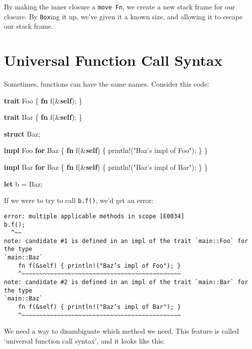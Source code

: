 \documentclass[a4paper,]{book}
\newenvironment{Shaded}{\begin{snugshade}}{\end{snugshade}}
\newcommand{\KeywordTok}[1]{\textcolor[rgb]{0.13,0.29,0.53}{\textbf{{#1}}}}
\newcommand{\StringTok}[1]{\textcolor[rgb]{0.31,0.60,0.02}{{#1}}}
\newcommand{\OtherTok}[1]{\textcolor[rgb]{0.56,0.35,0.01}{{#1}}}
\newcommand{\NormalTok}[1]{{#1}}
\begin{document}
By making the inner closure a \texttt{move\ Fn}, we create a new stack
frame for our closure. By \texttt{Box}ing it up, we've given it a known
size, and allowing it to escape our stack frame.

\section{Universal Function Call Syntax}\label{sec--ufcs}

Sometimes, functions can have the same names. Consider this code:

\begin{Shaded}
\begin{Highlighting}[]
\KeywordTok{trait} \NormalTok{Foo \{}
    \KeywordTok{fn} \NormalTok{f(&}\KeywordTok{self}\NormalTok{);}
\NormalTok{\}}

\KeywordTok{trait} \NormalTok{Bar \{}
    \KeywordTok{fn} \NormalTok{f(&}\KeywordTok{self}\NormalTok{);}
\NormalTok{\}}

\KeywordTok{struct} \NormalTok{Baz;}

\KeywordTok{impl} \NormalTok{Foo }\KeywordTok{for} \NormalTok{Baz \{}
    \KeywordTok{fn} \NormalTok{f(&}\KeywordTok{self}\NormalTok{) \{ }\OtherTok{println!}\NormalTok{(}\StringTok{"Baz’s impl of Foo"}\NormalTok{); \}}
\NormalTok{\}}

\KeywordTok{impl} \NormalTok{Bar }\KeywordTok{for} \NormalTok{Baz \{}
    \KeywordTok{fn} \NormalTok{f(&}\KeywordTok{self}\NormalTok{) \{ }\OtherTok{println!}\NormalTok{(}\StringTok{"Baz’s impl of Bar"}\NormalTok{); \}}
\NormalTok{\}}

\KeywordTok{let} \NormalTok{b = Baz;}
\end{Highlighting}
\end{Shaded}

If we were to try to call \texttt{b.f()}, we'd get an error:

\begin{verbatim}
error: multiple applicable methods in scope [E0034]
b.f();
  ^~~
note: candidate #1 is defined in an impl of the trait `main::Foo` for the type
`main::Baz`
    fn f(&self) { println!("Baz’s impl of Foo"); }
    ^~~~~~~~~~~~~~~~~~~~~~~~~~~~~~~~~~~~~~~~~~~~~~
note: candidate #2 is defined in an impl of the trait `main::Bar` for the type
`main::Baz`
    fn f(&self) { println!("Baz’s impl of Bar"); }
    ^~~~~~~~~~~~~~~~~~~~~~~~~~~~~~~~~~~~~~~~~~~~~~
\end{verbatim}

We need a way to disambiguate which method we need. This feature is
called `universal function call syntax', and it looks like this:
\end{document}

